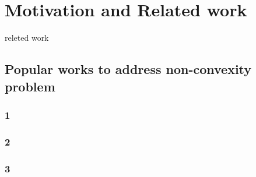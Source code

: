 \chapter{Motivation and Related work}\label{related_work}
releted work

\section{Popular works to address non-convexity problem}

\subsection{1}
\subsection{2}
\subsection{3}
